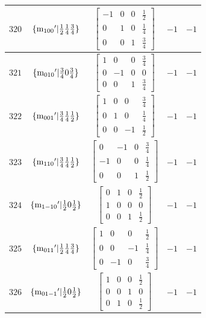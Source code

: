 \documentclass[fleqn,8pt]{jsarticle}
\begin{document}
\begin{longtable}{ccccc}
$ 320 $ & $ \{{\rm m}_{100}{}'|\frac{1}{2} \frac{1}{4} \frac{3}{4}\} $ & $ \begin{bmatrix} -1 & 0 & 0 & \frac{1}{2} \\ 0 & 1 & 0 & \frac{1}{4} \\ 0 & 0 & 1 & \frac{3}{4} \end{bmatrix} $ & $ -1 $ & $ -1 $ \\ \hline
$ 321 $ & $ \{{\rm m}_{010}{}'|\frac{3}{4} 0 \frac{3}{4}\} $ & $ \begin{bmatrix} 1 & 0 & 0 & \frac{3}{4} \\ 0 & -1 & 0 & 0 \\ 0 & 0 & 1 & \frac{3}{4} \end{bmatrix} $ & $ -1 $ & $ -1 $ \\ \hline
$ 322 $ & $ \{{\rm m}_{001}{}'|\frac{3}{4} \frac{1}{4} \frac{1}{2}\} $ & $ \begin{bmatrix} 1 & 0 & 0 & \frac{3}{4} \\ 0 & 1 & 0 & \frac{1}{4} \\ 0 & 0 & -1 & \frac{1}{2} \end{bmatrix} $ & $ -1 $ & $ -1 $ \\ \hline
$ 323 $ & $ \{{\rm m}_{110}{}'|\frac{3}{4} \frac{1}{4} \frac{1}{2}\} $ & $ \begin{bmatrix} 0 & -1 & 0 & \frac{3}{4} \\ -1 & 0 & 0 & \frac{1}{4} \\ 0 & 0 & 1 & \frac{1}{2} \end{bmatrix} $ & $ -1 $ & $ -1 $ \\ \hline
$ 324 $ & $ \{{\rm m}_{1-10}{}'|\frac{1}{2} 0 \frac{1}{2}\} $ & $ \begin{bmatrix} 0 & 1 & 0 & \frac{1}{2} \\ 1 & 0 & 0 & 0 \\ 0 & 0 & 1 & \frac{1}{2} \end{bmatrix} $ & $ -1 $ & $ -1 $ \\ \hline
$ 325 $ & $ \{{\rm m}_{011}{}'|\frac{1}{2} \frac{1}{4} \frac{3}{4}\} $ & $ \begin{bmatrix} 1 & 0 & 0 & \frac{1}{2} \\ 0 & 0 & -1 & \frac{1}{4} \\ 0 & -1 & 0 & \frac{3}{4} \end{bmatrix} $ & $ -1 $ & $ -1 $ \\ \hline
$ 326 $ & $ \{{\rm m}_{01-1}{}'|\frac{1}{2} 0 \frac{1}{2}\} $ & $ \begin{bmatrix} 1 & 0 & 0 & \frac{1}{2} \\ 0 & 0 & 1 & 0 \\ 0 & 1 & 0 & \frac{1}{2} \end{bmatrix} $ & $ -1 $ & $ -1 $ \\ \hline

\end{longtable}
\end{document}
